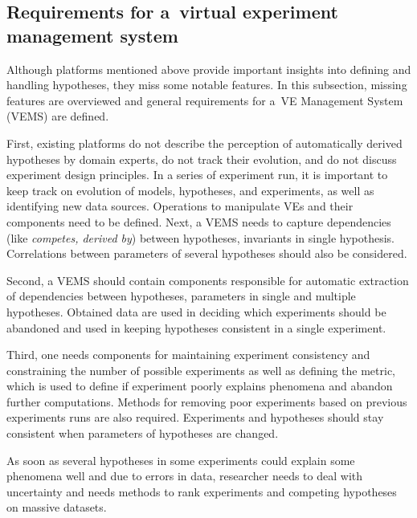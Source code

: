 \begin{multicols}{2}
\vspace*{-9pt}
      
\subsection{Requirements for a~virtual experiment management system}

\vspace*{-2pt}

      \noindent
      Although platforms mentioned above provide important insights into defining 
and handling hypotheses, they miss some notable features. In this subsection, missing 
features are overviewed and general requirements for a~VE
Management System (VEMS) are defined.
      
      First, existing platforms do not describe the perception of automatically 
derived hypotheses by domain experts, do not track their evolution, and do not 
discuss experiment design principles. In a series of experiment run, it is important to 
keep track on evolution of models, hypotheses, and experiments, as well as 
identifying new data sources. Operations to manipulate VEs and their 
components need to be defined. Next, a VEMS needs to capture dependencies (like 
\textit{competes, derived by}) between hypotheses, invariants in single hypothesis. 
Correlations between parameters of several hypotheses should also be considered.
      
      Second, a VEMS should contain components responsible for automatic 
extraction of dependencies between hypotheses, parameters in single and multiple 
hypotheses. Obtained data are used in deciding which experiments should be 
abandoned and used in keeping hypotheses consistent in a single experiment.
      
      Third, one needs components for maintaining experiment consistency and 
constraining the number of possible experiments as well as defining the metric, which 
is used to define if experiment poorly explains phenomena and abandon further 
computations. Methods for removing poor experiments based on previous 
experiments runs are also required. Experiments and hypotheses should stay 
consistent when parameters of hypotheses are changed.
      
      As soon as several hypotheses in some experiments could explain some 
phenomena well and due to errors in data, researcher needs to deal with uncertainty 
and needs methods to rank experiments and competing hypotheses on massive 
datasets.
      

\end{multicols}
